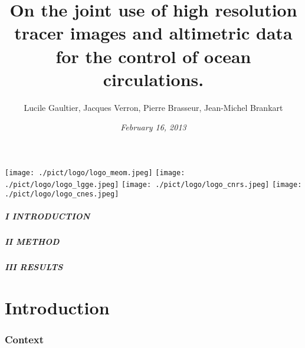 \documentclass[compress,slidescentered,notes=show]{beamer}
\title{On the joint use of high resolution tracer images \hspace{4cm} and altimetric data for the control of ocean circulations.}
\author[LPO]{Lucile Gaultier, Jacques Verron, Pierre Brasseur, Jean-Michel Brankart}
\date{\textit{February 16, 2013}}
\begin{document}
\begin{frame}
  \maketitle
{}
  \begin{center}
    \texttt{[image: ./pict/logo/logo\_meom.jpeg]}
    \hspace{0.5cm}
    \texttt{[image: ./pict/logo/logo\_lgge.jpeg]}
    \hspace{0.5cm}
    \texttt{[image: ./pict/logo/logo\_cnrs.jpeg]}
    \hspace{0.5cm}
    \texttt{[image: ./pict/logo/logo\_cnes.jpeg]}
  \end{center}

  \note{
}
\end{frame}

\logo{\insertframenumber/\inserttotalframenumber}
\begin{frame}
  \frametitle{I INTRODUCTION}
   
  \tableofcontents[part=1] %
\end{frame}
\begin{frame}
  \frametitle{II METHOD}
  
  \tableofcontents[part=2] %
\end{frame}
\begin{frame}
  \frametitle{III RESULTS}
  \tableofcontents[part=3] %
\end{frame}

\part{Introduction}

\section{Context}%
\begin{frame}
  \frametitle{\insertromanpartnumber \hspace{1em} \insertpart}
  
  \tableofcontents[hideothersections]
\end{frame}
\end{document}
